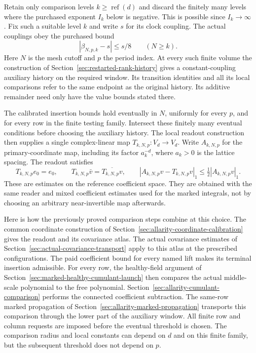 Retain only comparison levels $k\ge\operatorname{ref}(d)$ and discard
the finitely many levels where the purchased exponent $I_k$ below is
negative. This is possible since $I_k\to\infty$. Fix such a suitable
level $k$ and write $s$ for its clock coupling. The actual
couplings obey the purchased bound
\[
                  |\beta_{N,p,k}-s|\le s/8
                  \qquad(N\ge k).
\]
Here $N$ is the mesh cutoff and $p$ the period index. At every such finite
volume the construction of Section~\ref{sec:restarted-rank-history}
gives a constant-coupling auxiliary history on the required window.
Its transition identities and all its local comparisons refer to the
same endpoint as the original history. Its additive remainder need only
have the value bounds stated there.

The calibrated insertion bounds hold eventually in $N$, uniformly for
every $p$, and for every row in the finite testing family. Intersect these
finitely many eventual conditions before choosing the auxiliary history.
The local readout construction then supplies a single complex-linear map
$T_{k,N,p}:V_d\to V_d$. Write $A_{k,N,p}$ for the primary-coordinate map,
including its factor $a_k^{-d}$, where $a_k>0$ is the lattice spacing.
The readout satisfies
\begin{equation}\label{eq:rank-common-tested}
 T_{k,N,p}e_0=e_0,\qquad
 T_{k,N,p}\bar v=\overline{T_{k,N,p}v},\qquad
 |A_{k,N,p}v-T_{k,N,p}v|_1\le\tfrac12|A_{k,N,p}v|_1.
\end{equation}
These are estimates on the reference coefficient space. They are obtained
with the same reader and mixed coefficient estimates used for the marked
integrals, not by choosing an arbitrary near-invertible map afterwards.

Here is how the previously proved comparison steps combine at this
choice. The common coordinate construction of
Section~\ref{sec:allarity-coordinate-calibration} gives the readout and
its covariance atlas. The actual covariance estimates of
Section~\ref{sec:actual-covariance-transport} apply to this atlas at the
prescribed configurations. The paid coefficient bound for every named
lift makes its terminal insertion admissible. For every row, the
healthy-field argument of Section~\ref{sec:marked-healthy-cumulant-launch}
then compares the actual middle-scale polynomial to the free polynomial.
Section~\ref{sec:allarity-cumulant-comparison} performs the connected
coefficient subtraction. The same-row marked propagation of
Section~\ref{sec:allarity-marked-propagation} transports this comparison
through the lower part of the auxiliary window. All finite row and
column requests are imposed before the eventual threshold is chosen.
The comparison radius and local constants can depend on $d$ and on this
finite family, but the subsequent threshold does not depend on $p$.


